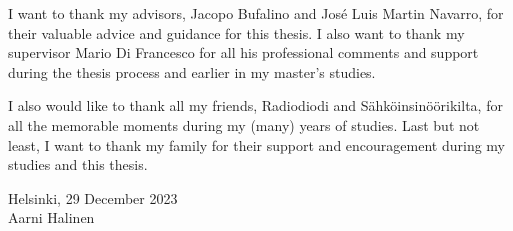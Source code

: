 \documentclass[english, 12pt, a4paper, sci, utf8, a-2b, online]{aaltothesis}
\begin{document}
\newpage

\dothesispagenumbering{}


I want to thank my advisors, Jacopo Bufalino and José Luis Martin Navarro, for their valuable advice and guidance for this thesis.
I also want to thank my supervisor Mario Di Francesco for all his professional comments and support during the thesis process and earlier in my master's studies.

I also would like to thank all my friends, Radiodiodi and Sähköinsinöörikilta, for all the memorable moments during my (many) years of studies.
Last but not least, I want to thank my family for their support and encouragement during my studies and this thesis.

\vspace{5cm}
Helsinki, 29 December 2023 \\

\vspace{5mm}
{\hfill Aarni Halinen \hspace{1cm}}

\newpage

\thesistableofcontents

\end{document}
